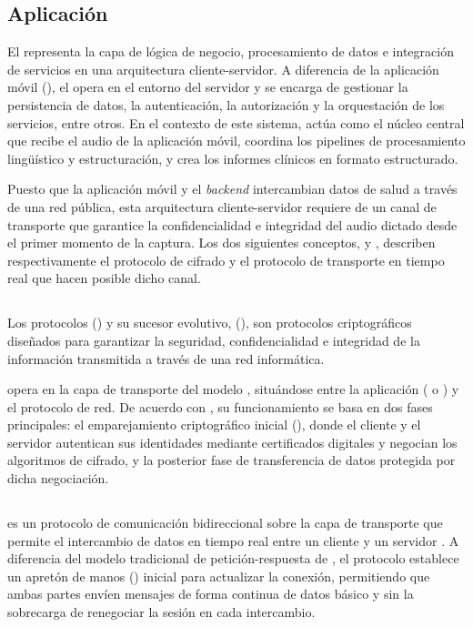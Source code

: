 \subsection{Aplicación }
El  representa la capa de lógica de negocio, procesamiento de datos 
e integración de servicios en una arquitectura cliente-servidor. A diferencia de la aplicación móvil
(), el  opera en el entorno del servidor y se encarga de 
gestionar la persistencia de datos, la autenticación, la autorización y la orquestación de los servicios,
entre otros. 
En el contexto de este sistema, actúa como el núcleo central que recibe el audio de la 
aplicación móvil, coordina los pipelines de procesamiento lingüístico y estructuración, 
y crea los informes clínicos en formato estructurado.


Puesto que la aplicación móvil y el \textit{backend} intercambian datos de salud a través de una
red pública, esta arquitectura cliente-servidor requiere de un canal de transporte que garantice
la confidencialidad e integridad del audio dictado desde el primer momento de la captura. Los dos
siguientes conceptos,  y , describen respectivamente el
protocolo de cifrado y el protocolo de transporte en tiempo real que hacen posible dicho canal.

\subsection{}
Los protocolos  () y su sucesor evolutivo,
 (), son protocolos criptográficos diseñados para garantizar
la seguridad, confidencialidad e integridad de la información transmitida a través de una red informática. 

 opera en la capa de transporte del modelo , situándose entre la aplicación 
( o ) y el protocolo de red. De acuerdo con , su funcionamiento se basa en dos
fases principales: el emparejamiento criptográfico inicial (), donde el cliente y el servidor autentican sus 
identidades mediante certificados digitales y negocian los algoritmos de cifrado, y la posterior fase de 
transferencia de datos protegida por dicha negociación.

\subsection{}
 es un protocolo de comunicación bidireccional sobre la capa de transporte
 que permite el intercambio de datos en tiempo real entre un cliente y un servidor
. 
A diferencia del modelo tradicional de petición-respuesta de , el protocolo establece un apretón de manos
() inicial para actualizar la conexión, permitiendo que ambas partes envíen mensajes
de forma continua de datos básico y sin la sobrecarga de renegociar la sesión en cada intercambio.

